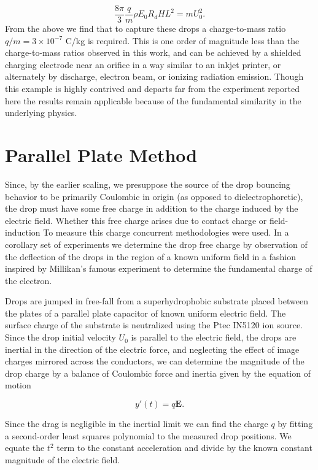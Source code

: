 \documentclass[12pt,a4paper,oneside]{book}
\begin{document}
\[
\frac{8 \pi}{3} \frac{q}{m} \rho E_0 R_d H L^2  = mU_0^2.
\]
From the above we find that to capture these drops a charge-to-mass ratio $q/m=3 \times 10^{-7}$ C/kg is required. This is one order of magnitude less than the charge-to-mass ratios observed in this work, and can be achieved by a shielded charging electrode near an orifice in a way similar to an inkjet printer, or alternately by discharge, electron beam, or ionizing radiation emission. Though this example is highly contrived and departs far from the experiment reported here the results remain applicable because of the fundamental similarity in the underlying physics.

\appendix
\appendixpage
\noappendicestocpagenum
\addappheadtotoc

\chapter{Parallel Plate Method}
\label{sec.drop_charge}
Since, by the earlier scaling, we presuppose the source of the drop bouncing behavior to be primarily Coulombic in origin (as opposed to dielectrophoretic), the drop must have some free charge in addition to the charge induced by the electric field. Whether this free charge arises due to contact charge or field-induction To measure this charge concurrent methodologies were used. In a corollary set of experiments we determine the drop free charge by observation of the deflection of the drops in the region of a known uniform field in a fashion inspired by Millikan's famous experiment to determine the fundamental charge of the electron.

Drops are jumped in free-fall from a superhydrophobic substrate placed between the plates of a parallel plate capacitor of known uniform electric field. The surface charge of the substrate is neutralized using the Ptec IN5120 ion source. Since the drop initial velocity $U_0$ is parallel to the electric field, the drops are inertial in the direction of the electric force, and neglecting the effect of image charges mirrored across the conductors, we can determine the magnitude of the drop charge by a balance of Coulombic force and inertia given by the equation of motion

\[ y'(t) = q\mathbf{E}. \]

Since the drag is negligible in the inertial limit we can find the charge $q$ by fitting a second-order least squares polynomial to the measured drop positions. We equate the $t^2$ term to the constant acceleration and divide by the known constant magnitude of the electric field.  
\end{document}
